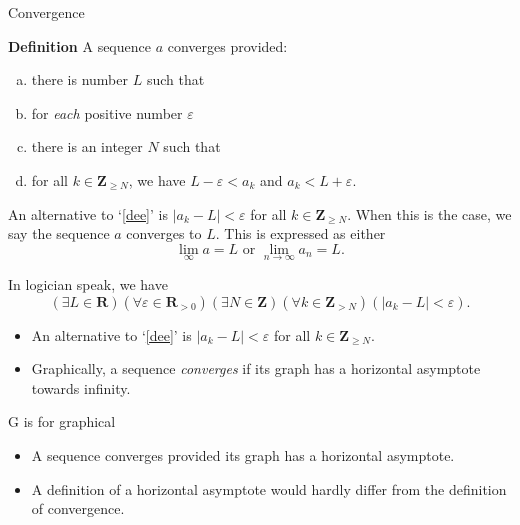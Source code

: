 \documentclass[portrait,fleqn,12pt]{beamer}
\newcommand{\reals}{\mathbf{R}}
\newenvironment{alphalist}
   {\begin{enumerate}[(a)]
       \addtolength{\itemsep}{-1.25\itemsep}}
     {\end{enumerate}}
\newcommand{\integers}{\mathbf{Z}}
\newenvironment{define}[1]{
  \textbf{Definition} #1}{}
\begin{document}
\begin{frame}{Convergence}

\begin{define} A sequence \(a\) converges provided:
\begin{alphalist}
\item there is number \(L\) such that
\item for \emph{each} positive number \(\varepsilon\) 
\item there is an  integer \(N\) such that
\item \label{dee} for all \(k \in \integers_{\geq N}\), we have
\(L  - \varepsilon < a_k\) and \(a_k < L + \varepsilon\).
\end{alphalist}
 An alternative to `\ref{dee}' is \(|a_k - L | < \varepsilon\)
for all \(k \in \integers_{\geq N}\).
When this is the case, we say the sequence \(a\) converges to
\(L\). This is expressed as either
\[
  \lim_{\infty} a = L \mbox{ or } \lim_{n \to \infty} a_n = L.
\]
\end{define}

In logician speak, we have
\begin{equation*}
\left(\exists L \in \reals\right) 
\left(\forall \varepsilon \in \reals_{>0}\right)
\left(\exists N \in \integers\right)
\left(\forall k \in \integers_{>N}\right)
\left(|a_k - L | <  \varepsilon \right).
\end{equation*}
\end{frame}
\begin{frame}
\begin{itemize}
\item An alternative to `\ref{dee}' is \(|a_k - L | < \varepsilon\)
for all \(k \in \integers_{\geq N}\).

\item Graphically, a sequence \emph{converges} if its graph has a
horizontal asymptote towards infinity.

\end{itemize}
\end{frame}
\begin{frame}{G is for graphical}

\begin{itemize}

\item A sequence converges provided its graph has a horizontal asymptote.

\item A  definition of a horizontal asymptote 
would hardly differ from the definition of convergence.

\end{itemize}

\end{frame}
\end{document}
